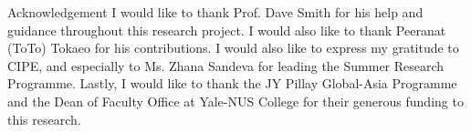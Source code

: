 \documentclass[serif, final, noamsthm]{beamer} %
\begin{document}
\begin{center}
\begin{frame}
\begin{columns}[t]
{\begin{block}{Acknowledgement}
\justifying
I would like to thank Prof. Dave Smith for his help and guidance throughout this research project. I would also like to thank Peeranat (ToTo) Tokaeo for his contributions. I would also like to express my gratitude to CIPE, and especially to Ms. Zhana Sandeva for leading the Summer Research Programme. Lastly, I would like to thank the JY Pillay Global-Asia Programme and the Dean of Faculty Office at Yale-NUS College for their generous funding to this research.
\end{block}
}
\end{columns}
\end{frame}

\end{center}
\end{document}

